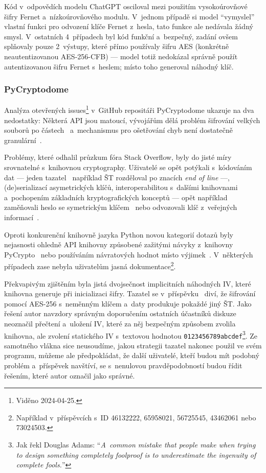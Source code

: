 Kód v~odpovědích modelu ChatGPT osciloval mezi použitím vysokoúrovňové šifry Fernet a~nízkoúrovňového modulu. V~jednom případě si model ``vymyslel'' vlastní funkci pro odvození klíče Fernet z~hesla, tato funkce ale nedávala žádný smysl. V~ostatních 4~případech byl kód funkční a~bezpečný, zadání ovšem splňovaly pouze 2~výstupy, které přímo používaly šifru AES (konkrétně neautentizovanou AES-256-CFB) --- model totiž nedokázal správně použít autentizovanou šifru Fernet s~heslem; místo toho generoval náhodný klíč.

\subsubsection*{PyCryptodome}

Analýza otevřených issues\footnote{Viděno 2024-04-25.} v~GitHub repositáři PyCryptodome ukazuje na dva nedostatky: Některá API jsou matoucí, vývojářům dělá problém šifrování velkých souborů po částech~\cite{pcd-issue-482, pcd-issue-646} a~mechanismus pro ošetřování chyb není dostatečně granulární~\cite{pcd-issue-320}.

Problémy, které odhalil průzkum fóra Stack Overflow, byly do jisté míry srovnatelné s~knihovnou cryptography. Uživatelé se opět potýkali s~kódováním dat --- jeden tazatel~\cite{so-54752085} například ŠT rozděloval po znacích \textit{end of line} ---, (de)serializací asymetrických klíčů, interoperabilitou s~dalšími knihovnami a~pochopením základních kryptografických konceptů --- opět například zaměňovali heslo se symetrickým klíčem~\cite{so-61645823} nebo odvozovali klíč z~veřejných informací~\cite{so-60476856}.

Oproti konkurenční knihovně jazyka Python novou kategorií dotazů byly nejasnosti ohledně API knihovny způsobené zažitými návyky z~knihovny PyCrypto~\cite{so-54964354} nebo používáním ná\-vra\-to\-vých hodnot místo výjimek~\cite{so-63655263}. V~některých případech zase nebyla uživatelům jasná dokumentace\footnote{Například v~příspěvcích s~ID 46132222, 65958021, 56725545, 43462061 nebo 73024503.}.

Překvapivým zjištěním byla jistá dvojsečnost implicitních náhodných IV, které knihovna generuje při inicializaci šifry. Tazatel se v~příspěvku~\cite{so-47990482} diví, že šifrování pomocí AES-256 s~neměnným klíčem a~daty produkuje pokaždé jiný ŠT. Jako řešení autor navzdory správným doporučením ostatních účastníků diskuze neoznačil přečtení a~uložení IV, které za něj bezpečným způsobem zvolila knihovna, ale zvolení statického IV s~textovou hodnotou \texttt{0123456789abcdef}\footnote{Jak řekl Douglas Adams: ``\textit{A~common mistake that people make when trying to design something completely foolproof is to underestimate the ingenuity of complete fools.}''}. Ze samotného vlákna sice neusoudíme, jakou strategii tazatel nakonec použil ve svém programu, můžeme ale předpokládat, že další uživatelé, kteří budou mít podobný problém a~příspěvek navštíví, se s~nenulovou pravděpodobností budou řídit řešením, které autor označil jako správné.

